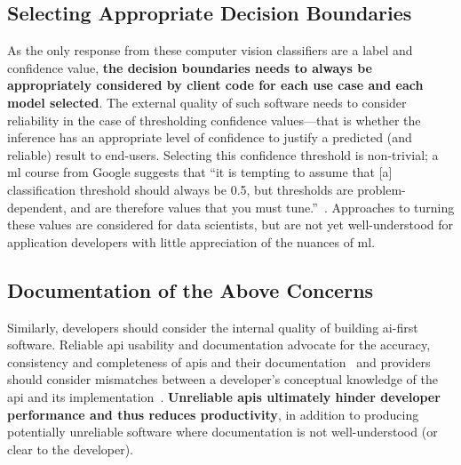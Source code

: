 \subsection{Selecting Appropriate Decision Boundaries}
As the only response from these computer vision classifiers are a label and confidence value, \textbf{the decision boundaries needs to always be appropriately considered by client code for each use case and each model selected}. 
The external quality of such software needs to consider reliability in the case of thresholding confidence values---that is whether the inference has an appropriate level of confidence to justify a predicted (and reliable) result to end-users. Selecting this confidence threshold is non-trivial; a \gls{ml} course from Google suggests that ``it is tempting to assume that [a] classification threshold should always be 0.5, but thresholds are problem-dependent, and are therefore values that you must tune.''~\citep{Classifi7:online}. 
Approaches to turning these values are considered for data scientists, but are not yet well-understood for application developers with little appreciation of the nuances of \gls{ml}. 

\subsection{Documentation of the Above Concerns}
Similarly, developers should consider the internal quality of building \gls{ai}-first software. Reliable \gls{api} usability and documentation advocate for the accuracy, consistency and completeness of \glspl{api} and their documentation~\citep{Piccioni:2013em,Robillard:2009uk} and providers should consider mismatches between a developer's conceptual knowledge of the \gls{api} and its implementation~\citep{Ko:2011fb}. \textbf{Unreliable \glspl{api} ultimately hinder developer performance and thus reduces productivity}, in addition to producing potentially unreliable software where documentation is not well-understood (or clear to the developer).